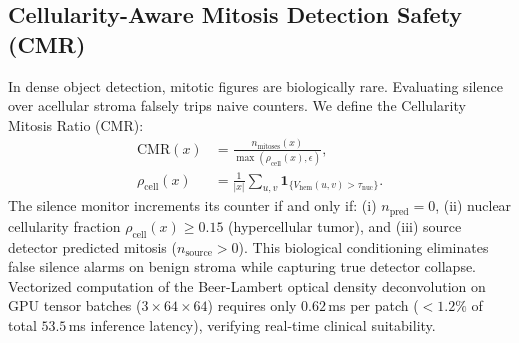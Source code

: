 \documentclass[journal]{IEEEtran}
\begin{document}
\subsection{Cellularity-Aware Mitosis Detection Safety (CMR)}
\label{sec:cmr}
In dense object detection, mitotic figures are biologically rare. Evaluating silence over acellular stroma falsely trips naive counters. We define the Cellularity Mitosis Ratio (CMR):
\begin{equation}
\label{eq:cmr}
\begin{aligned}
\text{CMR}(x) &= \frac{n_{\text{mitoses}}(x)}{\max(\rho_{\text{cell}}(x), \epsilon)}, \\
\rho_{\text{cell}}(x) &= \frac{1}{|x|} \sum_{u,v} \mathbf{1}_{\{V_{\text{hem}}(u,v) > \tau_{\text{nuc}}\}}.
\end{aligned}
\end{equation}
The silence monitor increments its counter if and only if: (i) $n_{\text{pred}} = 0$, (ii) nuclear cellularity fraction $\rho_{\text{cell}}(x) \ge 0.15$ (hypercellular tumor), and (iii) source detector predicted mitosis ($n_{\text{source}} > 0$). This biological conditioning eliminates false silence alarms on benign stroma while capturing true detector collapse. Vectorized computation of the Beer-Lambert optical density deconvolution on GPU tensor batches ($3 \times 64 \times 64$) requires only $0.62$\,ms per patch ($<1.2\%$ of total $53.5$\,ms inference latency), verifying real-time clinical suitability.
\end{document}
